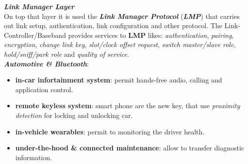 \textbf{\textit{Link Manager Layer}} \\
On top that layer it is used the \textbf{\textit{Link Manager Protocol}} (\textbf{\textit{LMP}}) that carries out link setup, authentication, link configuration and other protocol. The Link-Controller/Baseband provides services to \textbf{LMP} likes: \textit{authentication}, \textit{pairing}, \textit{encryption}, \textit{change link key}, \textit{slot/clock offset request}, \textit{switch master/slave role}, \textit{hold/sniff/park role} and \textit{quality of service}. \\
\textbf{\textit{Automotive \& Bluetooth}}:
\begin{itemize}[nosep]
    \item \textbf{in-car infortainment system}: permit hands-free audio, calling and application control.
    \item \textbf{remote keyless system}: smart phone are the new key, that use \textit{proximity detection} for locking and unlocking car.
    \item \textbf{in-vehicle wearables}: permit to monitoring the driver health.
    \item \textbf{under-the-hood \& connected maintenance}: allow to transfer diagnostic information.
\end{itemize}
